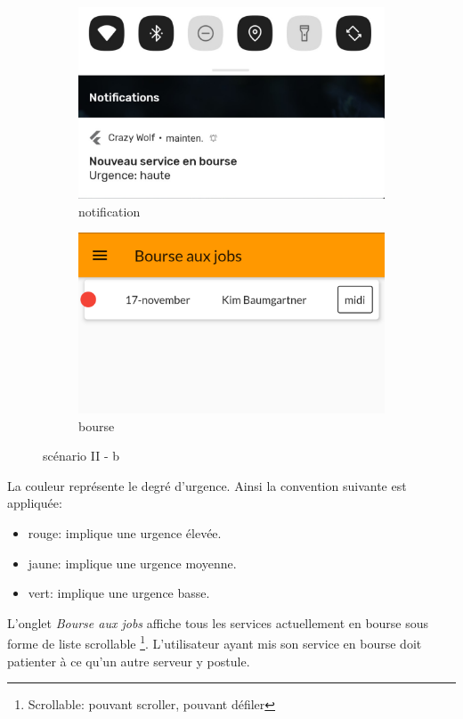 \begin{figure}[!h]
    \centering
    \begin{subfigure}[]{.3\textwidth}
        \centering
        \includegraphics[width=0.9\linewidth]{screenshots/scenario_02/notification.png}
        \caption{notification}
        \label{fig:notif}
    \end{subfigure}
    \begin{subfigure}{.3\textwidth}
        \centering
        \includegraphics[width=0.9\linewidth]{screenshots/scenario_02/bourse_jobs.png}
        \caption{bourse}
        \label{fig:bourse}
    \end{subfigure}
    \caption{scénario II - b}
    \label{fig:scen02b}
\end{figure}

La couleur représente le degré d'urgence. Ainsi la convention suivante est appliquée:
\smallskip
\begin{itemize}
    \item rouge: implique une urgence élevée.
    \item jaune: implique une urgence moyenne.
    \item vert: implique une urgence basse.
\end{itemize}
\smallskip
L'onglet \textit{Bourse aux jobs} affiche tous les services actuellement en bourse sous
forme de liste scrollable \footnote{ Scrollable: pouvant scroller, pouvant défiler  }. L'utilisateur ayant mis son service en bourse
doit patienter à ce qu'un autre serveur y postule.

